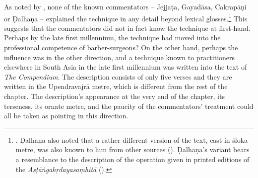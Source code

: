 As noted by \citeauthor{meul-hist}, none of the known commentators -- Jejjaṭa,
Gayadāsa, Cakrapāṇi or Ḍalhaṇa -- explained the technique in any detail beyond
lexical glosses.\footnote{\cite[IB, 328]{meul-hist}. Ḍalhaṇa also noted that a
rather different version of the text, cast in śloka metre, was also known to him
from other sources ().  Ḍalhaṇa's variant bears a 
resemblance
to the description of the operation given in printed editions of the
\emph{Aṣṭāṅgahṛdayasaṃhitā} ().} %
This suggests that the commentators did not in fact know the technique at
first-hand. Perhaps by the late first millennium, the technique had moved into the
professional competence of barber-surgeons?  On the other hand, perhaps the
influence was in the other direction, and a technique known to practitioners
elsewhere in South Asia in the late first millennium was written into the text of
\emph{The Compendium}. The description consists of only five verses and they 
are
written in the Upendravajrā metre, which is different from the rest of the
chapter.  The description's appearance at the very end of the chapter, its
terseness, its ornate metre, and the paucity of the commentators' treatment could
all be taken as pointing in this direction.

